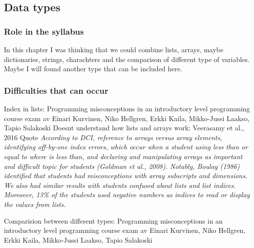 \subsection{Data types}

\subsubsection{Role in the syllabus}

In this chapter I was thinking that we could combine lists, arrays, maybe dictionaries, strings, charachters and the comparison of different type of variables. Maybe I will found another type that can be included here. 

\subsubsection{Difficulties that can occur}

Index in lists: Programming misconceptions in an introductory level programming course exam av Einari Kurvinen, Niko Hellgren, Erkki Kaila, Mikko-Jussi Laakso, Tapio Salakoski
Doesnt understand how lists and arrays work: Veerasamy et al., 2016 Quote \emph{According to DCI, reference to arrays versus array elements, identifying off-by-one index errors, which occur when a student using less than or equal to where is less than, and declaring and manipulating arrays as important and difficult topic for students (Goldman et al., 2008). Notably, Boulay (1986) identified that students had misconceptions with array subscripts and dimensions. We also had similar results with students confused about lists and list indices. Moreover, 13\% of the students used negative numbers as indices to read or display the values from lists.}

Comparision between different types: Programming misconceptions in an introductory level programming course exam av Einari Kurvinen, Niko Hellgren, Erkki Kaila, Mikko-Jussi Laakso, Tapio Salakoski

